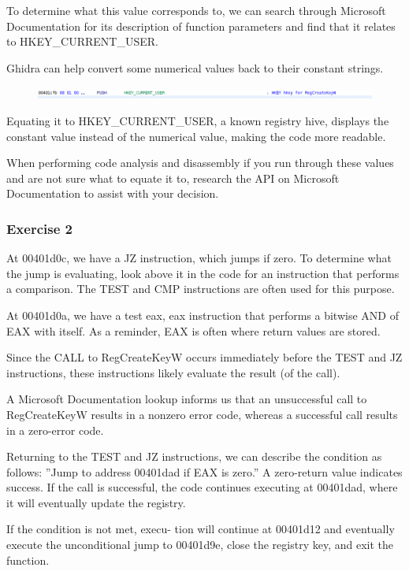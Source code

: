 \documentclass[]{project_plan}
\begin{document}
To determine what this value corresponds to, we can search through Microsoft
Documentation for its description of function parameters and find that it
relates to HKEY\_CURRENT\_USER.

Ghidra can help convert some numerical values back to their
constant strings.

\begin{figure}[H]
  \centering
  \includegraphics[width=\linewidth]{lab2 ghidra strings.png}
\end{figure}

Equating it to HKEY\_CURRENT\_USER, a known registry hive, displays
the constant value instead of the numerical value, making the code
more readable.

When performing code analysis and disassembly if you run
through these values and are not sure what to equate it to,
research the API on Microsoft Documentation to assist with
your decision.

\subsubsection{Exercise 2}

At 00401d0c, we have a JZ instruction, which jumps if zero. To determine
what the jump is evaluating, look above it in the code for an instruction that
performs a comparison. The TEST and CMP instructions are often used for this
purpose.

At 00401d0a, we have a test eax, eax instruction that performs a
bitwise AND of EAX with itself. As a reminder, EAX is often where return values
are stored.

Since the CALL to RegCreateKeyW occurs immediately before the
TEST and JZ instructions, these instructions likely evaluate the result (of the call).

A Microsoft Documentation lookup informs us that an unsuccessful call to
RegCreateKeyW results in a nonzero error code, whereas a successful call results
in a zero-error code.

Returning to the TEST and JZ instructions, we can describe the condition as
follows: ”Jump to address 00401dad if EAX is zero.” A zero-return value
indicates success. If the call is successful, the code continues executing at
00401dad,
where it will eventually update the registry.

If the condition is not met, execu-
tion will continue at 00401d12 and eventually execute the unconditional jump
to 00401d9e, close the registry key, and exit the function.
\end{document}
